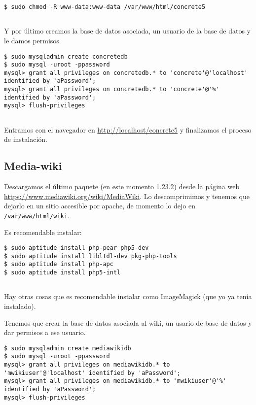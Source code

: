 \begin{verbatim}
$ sudo chmod -R www-data:www-data /var/www/html/concrete5
      
\end{verbatim}

Y por último creamos la base de datos asociada, un usuario de la base de
datos y le damos permisos.

\begin{verbatim}
$ sudo mysqladmin create concretedb
$ sudo mysql -uroot -ppassword
mysql> grant all privileges on concretedb.* to 'concrete'@'localhost' identified by 'aPassword';
mysql> grant all privileges on concretedb.* to 'concrete'@'%' identified by 'aPassword';
mysql> flush-privileges
      
\end{verbatim}

Entramos con el navegador en \url{http://localhost/concrete5} y
finalizamos el proceso de instalación.

\subsection{Media-wiki}\label{media-wiki}

Descargamos el último paquete (en este momento 1.23.2) desde la página
web \url{https://www.mediawiki.org/wiki/MediaWiki}. Lo descomprimimos y
tenemos que dejarlo en un sitio accesible por apache, de momento lo dejo
en \texttt{/var/www/html/wiki}.

Es recomendable instalar:

\begin{verbatim}
$ sudo aptitude install php-pear php5-dev
$ sudo aptitude install libltdl-dev pkg-php-tools
$ sudo aptitude install php-apc
$ sudo aptitude install php5-intl
      
\end{verbatim}

Hay otras cosas que es recomendable instalar como ImageMagick (que yo ya
tenía instalado).

Tenemos que crear la base de datos asociada al wiki, un usario de base
de datos y dar permisos a ese usuario.

\begin{verbatim}
$ sudo mysqladmin create mediawikidb
$ sudo mysql -uroot -ppassword
mysql> grant all privileges on mediawikidb.* to 'mwikiuser'@'localhost' identified by 'aPassword';
mysql> grant all privileges on mediawikidb.* to 'mwikiuser'@'%' identified by 'aPassword';
mysql> flush-privileges
      
\end{verbatim}


